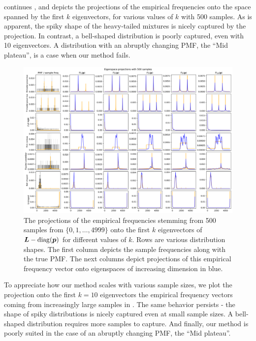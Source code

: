 \documentclass[10pt]{article} %
\DeclareMathOperator{\diag}{diag}
\begin{document}
 continues , and depicts the projections of the empirical frequencies onto the space spanned by the first $k$ eigenvectors, for various values of $k$ with 500 samples. As is apparent, the spiky shape of the heavy-tailed mixtures is nicely captured by the projection. In contrast, a bell-shaped distribution is poorly captured, even with 10 eigenvectors. A distribution with an abruptly changing PMF, the ``Mid plateau'', is a case when our method fails.

\begin{figure}[tbh]
    \centering
    \includegraphics[width=\textwidth]{proj_500_samples}
    \caption{The projections of the empirical frequencies stemming from 500 samples from $\{0, 1, \dots, 4999\}$ onto the first $k$ eigenvectors of $\mL - \diag(\vp)$ for different values of $k$. Rows are various distribution shapes. The first column depicts the sample frequencies along with the true PMF. The next columns depict projections of this empirical frequency vector onto eigenspaces of increasing dimension in blue.}
    \label{fig:apx_synthetic_500}
\end{figure}

To appreciate how our method scales with various sample sizes, we plot the projection onto the first $k=10$ eigenvectors the empirical frequency vectors coming from increasingly large samples in . The same behavior persists - the shape of spiky distributions is nicely captured even at small sample sizes. A bell-shaped distribution requires more samples to capture. And finally, our method is poorly suited in the case of an abruptly changing PMF, the ``Mid plateau''. 
\end{document}
